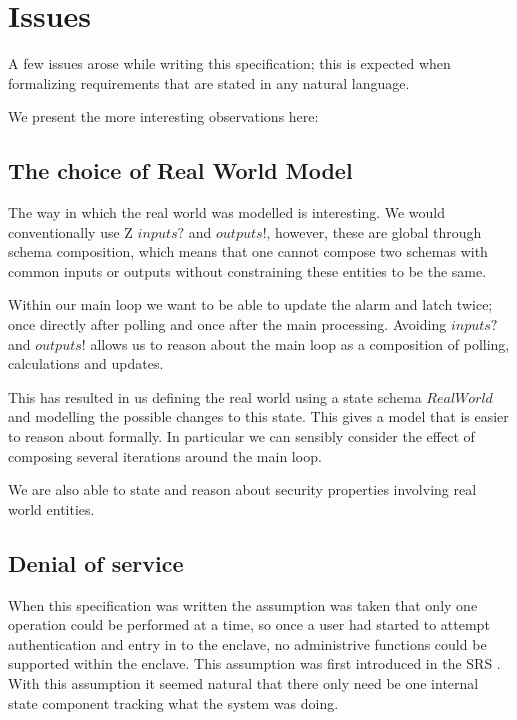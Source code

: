 \section{Issues}
A few issues arose while writing this specification; this is expected
when formalizing requirements that are stated in any natural language.

We present the more interesting observations here:

\subsection{The choice of Real World Model}
The way in which the real world was modelled is interesting. We would
conventionally  use Z $inputs?$ and $outputs!$, however, these are
global through schema composition, which means that one cannot compose
two schemas with common inputs or outputs without constraining these
entities to be the same. 

Within our main loop we want to be able to update the alarm and latch
twice; once directly after polling and once after the main
processing.
Avoiding $inputs?$ and $outputs!$ allows us to reason about the main loop as
a composition of polling, calculations and updates.

This has resulted in us defining the real world using a state schema
$RealWorld$ and modelling the possible changes to this state. This
gives a model that is easier to reason about formally. In particular
we can sensibly consider the effect of composing several iterations
around the main loop.

We are also able to state and reason about security properties
involving real world entities.

\subsection{Denial of service}
When this specification was written the assumption was taken that
only one operation could be performed at a time, so once a user had
started to attempt authentication and entry in to the enclave, no
administrive functions could be supported within the enclave. This
assumption was first introduced in the SRS \cite{SRS}. With this
assumption it seemed natural that there only need be one internal
state component tracking what the system was doing. 

